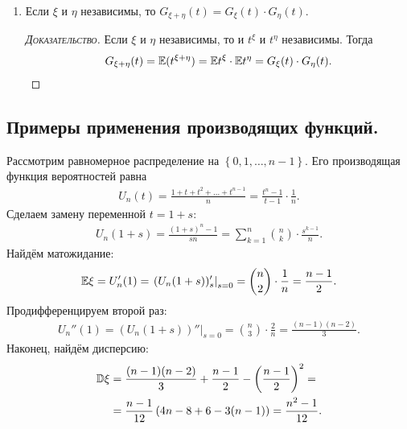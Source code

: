 \documentclass[../main.tex]{subfiles}
\begin{document}
\begin{prop}
\begin{enumerate}
\begin{proof}[\normalfont\textsc{Доказательство}]
\begin{align*}
     \D\xi &= \E\xi^{2} - (\E\xi)^{2} = G_\xi''(1) + G_\xi'(1) - G_\xi'(1)^{2}.
    \end{align*}
   \end{proof}
  \item Если $ \xi $ и $ \eta $ независимы, то $ G_{\xi + \eta}(t) = G_{\xi}(t) \cdot G_\eta(t) $.
   \begin{proof}[\normalfont\textsc{Доказательство}]
    Если $ \xi $ и $ \eta $ независимы, то и $ t^{\xi}  $ и $ t^{\eta} $ независимы. Тогда
    \begin{align*}
     G_{\xi+\eta}(t) = \mathbb E(t^{\xi+\eta}) = \mathbb E t^{\xi} \cdot \mathbb E t^{\eta} = G_\xi(t) \cdot G_\eta(t).
    \end{align*}
   \end{proof}
 \end{enumerate}
\end{prop}

\subsection{Примеры применения производящих функций.}

\begin{exmpl}
 Рассмотрим равномерное распределение на $  \left\{ 0,1,\ldots,n-1 \right\} $. Его производящая функция вероятностей равна
 \begin{align*}
  U_n(t) = \frac{1 + t + t^{2} + \ldots + t^{n-1}}{n} = \frac{t^{n}-1}{t-1} \cdot \frac{1}{n}.
 \end{align*} Сделаем замену переменной $ t = 1 + s $:
 \begin{align*}
  U_n(1 + s) = \frac{(1+s)^{n} - 1}{sn} = \sum_{k=1}^{n} \binom n k  \cdot \frac{s^{k-1}}{n}.
 \end{align*} Найдём матожидание:
 \begin{align*}
  \mathbb E \xi = U'_n(1) = \left.(U_n(1 + s))'_s\right|_{s=0} = \binom n 2 \cdot \frac{1}{n} = \frac{n-1}{2}.
  \end{align*} Продифференцируем второй раз:
  \begin{align*}
   U_n''(1) = \left.(U_n(1 + s))''\right|_{s=0} = \binom n 3 \cdot \frac{2}{n} = \frac{(n-1)(n-2)}{3}.
   \end{align*} Наконец, найдём дисперсию:
   \begin{align*}
    \mathbb D \xi &= \frac{(n-1)(n-2)}{3} + \frac{n-1}{2} - \left( \frac{n-1}{2} \right)^{2} = \\
    &= \frac{n - 1}{12} \left( 4n - 8 + 6 - 3(n - 1) \right) = \frac{n^{2}-1}{12}.
   \end{align*}
  \end{exmpl}
\end{document}
